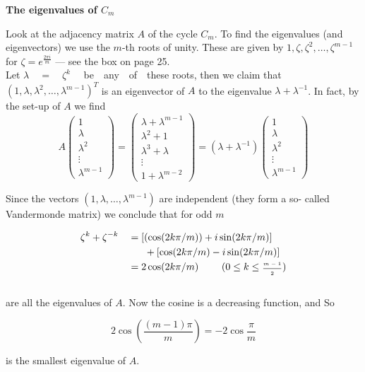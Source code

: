 \documentclass[openany,12pt]{memoir}
\newcommand{\setnewpagemargins}{
    \clearpage
    \setulmarginsandblock{2cm}{0.5cm}{*}
    \checkandfixthelayout
}
\begin{document}
\begin{mdframed}[nobreak=true]
\vspace{8pt}
{\Large\textbf{The eigenvalues of $C_m$}}
\vspace{5pt}

Look at the adjacency matrix $A$ of the cycle $C_m$. To find the eigenvalues 
(and eigenvectors) we use the $m$-th roots of unity. These are 
given by $1, \zeta, \zeta^2, \ldots, \zeta^{m-1}$ for $\zeta = e^{\frac{2\pi i}{m}}$ --- see the box on page 25.\\ 
Let $\lambda \quad=\quad\zeta ^k$ \ \ be\ \  any\ \  of\ \  these roots, then we claim that
$(1, \lambda, \lambda^2, \ldots, \lambda^{m-1})^T$ is an eigenvector of $A$ to the eigenvalue $\lambda + \lambda^{-1}$.
In fact, by the set-up of $A$ we find\\

\[
A \begin{pmatrix} 1 \\ \lambda \\ \lambda^2 \\ \vdots \\ \lambda^{m-1} \end{pmatrix}=
\begin{pmatrix} \lambda + \lambda^{m-1} \\ \lambda^2 + 1 \\ \lambda^3 + \lambda \\ \vdots \\ 1+\lambda^{m-2} \end{pmatrix} =
(\lambda + \lambda^{-1}) \begin{pmatrix} 1 \\ \lambda \\ \lambda^2 \\ \vdots \\ \lambda^{m-1} \end{pmatrix} 
\]

Since the vectors $(1, \lambda, \ldots, \lambda^{m-1})$ are independent (they form a so-
called Vandermonde matrix) we conclude that for odd $m$

\begin{equation*}
\begin{aligned}
    \zeta^k + \zeta^{-k}&\quad = [(\cos(2k\pi / m)) + i\sin(2k\pi / m)]\\
&\quad\quad\ \  + [\cos(2k\pi/m) - i\sin(2k\pi / m)]\\
&\quad =  2\cos(2k\pi / m) \quad\quad\  (0 \leq k \leq \text{\tiny{$\frac{m-1}{2}$}})
\end{aligned}
\end{equation*}\\

are all the eigenvalues of $A$. Now the cosine is a decreasing function,
and So

\[
    2\cos({\frac{(m-1)\pi}{m}}) = -2\cos{\frac{\pi}{m}}
\]

is the smallest eigenvalue of $A$. 

\vspace{8pt}
\end{mdframed}



\setnewpagemargins


\end{document}
